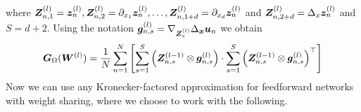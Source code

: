 where ${\bm{Z}}_{n, 1}^{(l)} = {\bm{z}}_n^{(l)}, {\bm{Z}}_{n, 2}^{(l)} = \partial_{x_1}{\bm{z}}_n^{(l)}, \dots, {\bm{Z}}_{n, 1+d}^{(l)} = \partial_{x_d}{\bm{z}}_n^{(l)}$ and ${\bm{Z}}_{n, 2+d}^{(l)} = \Delta_x{\bm{z}}_n^{(l)}$ and $S=d+2$.
Using the notation
${\bm{g}}_{n, s}^{(l)} = \nabla_{{\bm{Z}}_{s}^{(l)}} \Delta_{\bm{x}}{\bm{u}}_n$ we obtain
\begin{equation}\label{eq:laplace_gramian_block_exact}
    {\bm{G}}_\Omega({\bm{W}}^{(l)})
    =
    \frac1N\sum_{n=1}^N
    \left[\sum_{s=1}^S \left( {\bm{Z}}^{(l-1)}_{n,s}\otimes {\bm{g}}_{n,s}^{(l)} \right)
    \cdot
    \sum_{s=1}^S \left( {\bm{Z}}
    ^{(l-1)}_{n,s}\otimes {\bm{g}}_{n,s}^{(l)} \right)^\top\right]
\end{equation}
Now we can use any Kronecker-factored approximation for feedforward networks with weight sharing, where we choose to work with the following.

%

